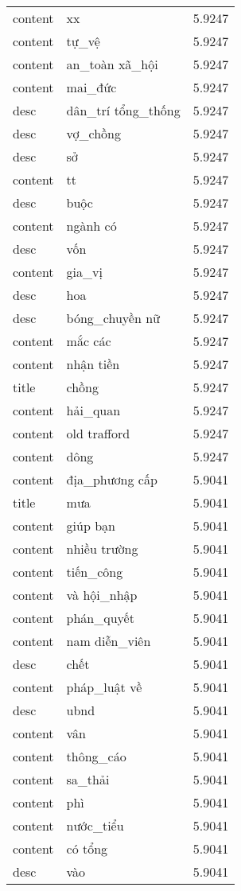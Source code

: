 \documentclass{article}
\begin{document}
\begin{tabular}{lll}
content & xx & 5.9247\\
content & tự\_vệ & 5.9247\\
content & an\_toàn xã\_hội & 5.9247\\
content & mai\_đức & 5.9247\\
desc & dân\_trí tổng\_thống & 5.9247\\
desc & vợ\_chồng & 5.9247\\
desc & sở & 5.9247\\
content & tt & 5.9247\\
desc & buộc & 5.9247\\
content & ngành có & 5.9247\\
desc & vốn & 5.9247\\
content & gia\_vị & 5.9247\\
desc & hoa & 5.9247\\
desc & bóng\_chuyền nữ & 5.9247\\
content & mắc các & 5.9247\\
content & nhận tiền & 5.9247\\
title & chồng & 5.9247\\
content & hải\_quan & 5.9247\\
content & old trafford & 5.9247\\
content & dông & 5.9247\\
content & địa\_phương cấp & 5.9041\\
title & mưa & 5.9041\\
content & giúp bạn & 5.9041\\
content & nhiều trường & 5.9041\\
content & tiến\_công & 5.9041\\
content & và hội\_nhập & 5.9041\\
content & phán\_quyết & 5.9041\\
content & nam diễn\_viên & 5.9041\\
desc & chết & 5.9041\\
content & pháp\_luật về & 5.9041\\
desc & ubnd & 5.9041\\
content & vân & 5.9041\\
content & thông\_cáo & 5.9041\\
content & sa\_thải & 5.9041\\
content & phì & 5.9041\\
content & nước\_tiểu & 5.9041\\
content & có tổng & 5.9041\\
desc & vào & 5.9041\\

\end{tabular}
\end{document}
